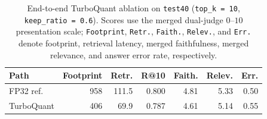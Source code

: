 \begin{table}[htbp]
\centering
\caption{End-to-end TurboQuant ablation on \texttt{test40} (\texttt{top\_k = 10}, \texttt{keep\_ratio = 0.6}). Scores use the merged dual-judge $0$--$10$ presentation scale; \texttt{Footprint}, \texttt{Retr.}, \texttt{Faith.}, \texttt{Relev.}, and \texttt{Err.} denote footprint, retrieval latency, merged faithfulness, merged relevance, and answer error rate, respectively.}
\label{tab:turboquant-e2e-ablation}
{\small
\setlength{\tabcolsep}{3.8pt}
\begin{tabular}{@{}l r r r r r r@{}}
\toprule
Path & Footprint & Retr. & R@10 & Faith. & Relev. & Err. \\
\midrule
FP32 ref. & 958 & 111.5 & 0.800 & 4.81 & 5.33 & 0.50 \\
TurboQuant & 406 & 69.9 & 0.787 & 4.61 & 5.14 & 0.55 \\
\bottomrule
\end{tabular}
}
\end{table}
